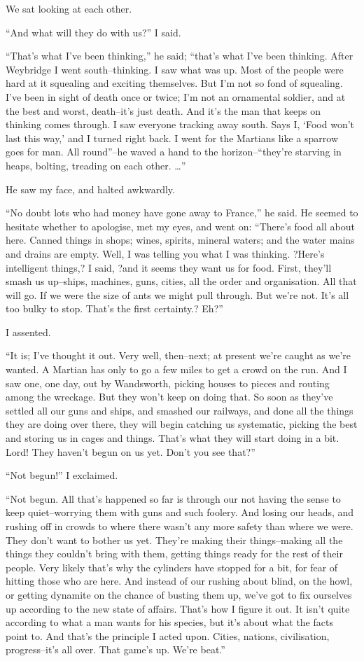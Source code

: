 We sat looking at each other.

``And what will they do with us?'' I said.

``That's what I've been thinking,'' he said; ``that's what I've been
thinking. After Weybridge I went south--thinking. I saw what was
up. Most of the people were hard at it squealing and exciting
themselves. But I'm not so fond of squealing. I've been in sight of
death once or twice; I'm not an ornamental soldier, and at the best
and worst, death--it's just death. And it's the man that keeps on
thinking comes through. I saw everyone tracking away south. Says I,
`Food won't last this way,' and I turned right back. I went for the
Martians like a sparrow goes for man. All round''--he waved a hand
to the horizon--``they're starving in heaps, bolting, treading on
each other. \ldots{}''

He saw my face, and halted awkwardly.

``No doubt lots who had money have gone away to France,'' he said. He
seemed to hesitate whether to apologise, met my eyes, and went on:
``There's food all about here. Canned things in shops; wines,
spirits, mineral waters; and the water mains and drains are empty.
Well, I was telling you what I was thinking. ?Here's intelligent
things,? I said, ?and it seems they want us for food. First,
they'll smash us up--ships, machines, guns, cities, all the order
and organisation. All that will go. If we were the size of ants we
might pull through. But we're not. It's all too bulky to stop.
That's the first certainty.? Eh?''

I assented.

``It is; I've thought it out. Very well, then--next; at present
we're caught as we're wanted. A Martian has only to go a few miles
to get a crowd on the run. And I saw one, one day, out by
Wandsworth, picking houses to pieces and routing among the
wreckage. But they won't keep on doing that. So soon as they've
settled all our guns and ships, and smashed our railways, and done
all the things they are doing over there, they will begin catching
us systematic, picking the best and storing us in cages and things.
That's what they will start doing in a bit. Lord! They haven't
begun on us yet. Don't you see that?''

``Not begun!'' I exclaimed.

``Not begun. All that's happened so far is through our not having
the sense to keep quiet--worrying them with guns and such foolery.
And losing our heads, and rushing off in crowds to where there
wasn't any more safety than where we were. They don't want to
bother us yet. They're making their things--making all the things
they couldn't bring with them, getting things ready for the rest of
their people. Very likely that's why the cylinders have stopped for
a bit, for fear of hitting those who are here. And instead of our
rushing about blind, on the howl, or getting dynamite on the chance
of busting them up, we've got to fix ourselves up according to the
new state of affairs. That's how I figure it out. It isn't quite
according to what a man wants for his species, but it's about what
the facts point to. And that's the principle I acted upon. Cities,
nations, civilisation, progress--it's all over. That game's up.
We're beat.''

